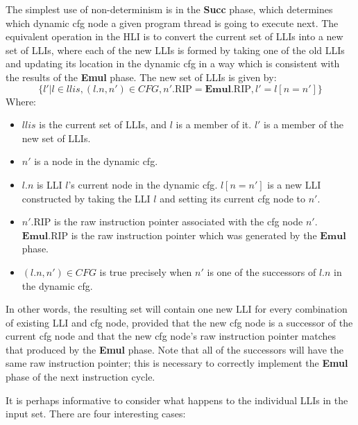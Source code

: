 The simplest use of non-determinism is in the \textbf{Succ} phase,
which determines which dynamic \gls{cfg} node a given program thread
is going to execute next.  The equivalent operation in the HLI is to
convert the current set of LLIs into a new set of LLIs, where each of
the new LLIs is formed by taking one of the old LLIs and updating its
location in the dynamic \gls{cfg} in a way which is consistent with
the results of the \textbf{Emul} phase.  The new set of LLIs is given
by:
\begin{displaymath}
\{l' | l \in \mathit{llis}, (l.n, n') \in \mathit{CFG}, n'.\mathrm{RIP} = \mathbf{Emul}.\mathrm{RIP}, l' = l[n = n'] \}
\end{displaymath}
Where:
\begin{itemize}
\item $\mathit{llis}$ is the current set of LLIs, and $l$ is a member of it.
  $l'$ is a member of the new set of LLIs.
\item $n'$ is a node in the dynamic \gls{cfg}.
\item $l.n$ is LLI $l$'s current node in the dynamic \gls{cfg}.  $l[n =
  n']$ is a new LLI constructed by taking the LLI $l$ and setting its
  current \gls{cfg} node to $n'$.
\item $n'.\mathrm{RIP}$ is the raw instruction pointer associated with
  the \gls{cfg} node $n'$.  $\mathbf{Emul}.\mathrm{RIP}$ is the raw
  instruction pointer which was generated by the $\mathbf{Emul}$
  phase.
\item $(l.n, n') \in \mathit{CFG}$ is true precisely when $n'$ is one
  of the successors of $l.n$ in the dynamic \gls{cfg}.
\end{itemize}
In other words, the resulting set will contain one new LLI for every
combination of existing LLI and \gls{cfg} node, provided that the new
\gls{cfg} node is a successor of the current \gls{cfg} node and that
the new \gls{cfg} node's raw instruction pointer matches that produced
by the \textbf{Emul} phase.  Note that all of the successors will have
the same raw instruction pointer; this is necessary to correctly
implement the \textbf{Emul} phase of the next instruction cycle.

It is perhaps informative to consider what happens to the individual
LLIs in the input set.  There are four interesting cases:

